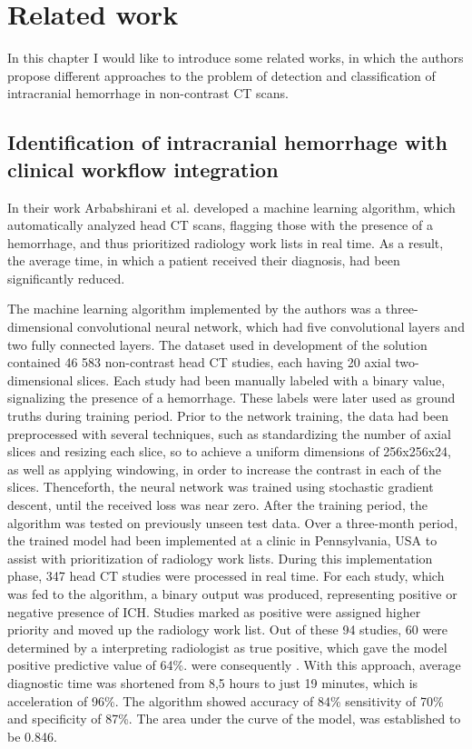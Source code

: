 \chapter{Related work}
In this chapter I would like to introduce some related works, in which the authors propose different approaches to the problem of detection and classification of intracranial hemorrhage in non-contrast CT scans.

\section{Identification of intracranial hemorrhage with clinical workflow integration}
 
In their work \cite{relatedWork1} Arbabshirani et al. developed a machine learning algorithm, which automatically analyzed head CT scans, flagging those with the presence of a hemorrhage, and thus prioritized radiology work lists in real time. As a result, the average time, in which a patient received their diagnosis, had been significantly reduced.  

The machine learning algorithm implemented by the authors was a three-dimensional convolutional neural network, which had five convolutional layers and two fully connected layers. The dataset used in development of the solution contained 46 583 non-contrast head CT studies, each having 20 axial two-dimensional slices. Each study had been manually labeled with a binary value, signalizing the presence of a hemorrhage. These labels were later used as ground truths during training period. Prior to the network training, the data had been preprocessed with several techniques, such as standardizing the number of axial slices and resizing each slice, so to achieve a uniform dimensions of 256x256x24, as well as applying windowing, in order to increase the contrast in each of the slices. Thenceforth, the neural network was trained using stochastic gradient descent, until the received loss was near zero. After the training period, the algorithm was tested on previously unseen test data.
Over a three-month period, the trained model had been implemented at a clinic in Pennsylvania, USA to assist with prioritization of radiology work lists. During this implementation phase, 347 head CT studies were processed in real time. For each study, which was fed to the algorithm, a binary output was produced, representing positive or negative presence of ICH. Studies marked as positive were assigned higher priority and moved up the radiology work list. Out of these 94 studies, 60 were determined by a interpreting radiologist as true positive, which gave the model positive predictive value of 64\%. were consequently . With this approach, average diagnostic time was shortened from 8,5 hours to just 19 minutes, which is acceleration of 96\%. The algorithm showed accuracy of 84\% sensitivity of 70\%  and specificity of 87\%. The area under the curve of the model, was established to be 0.846.

